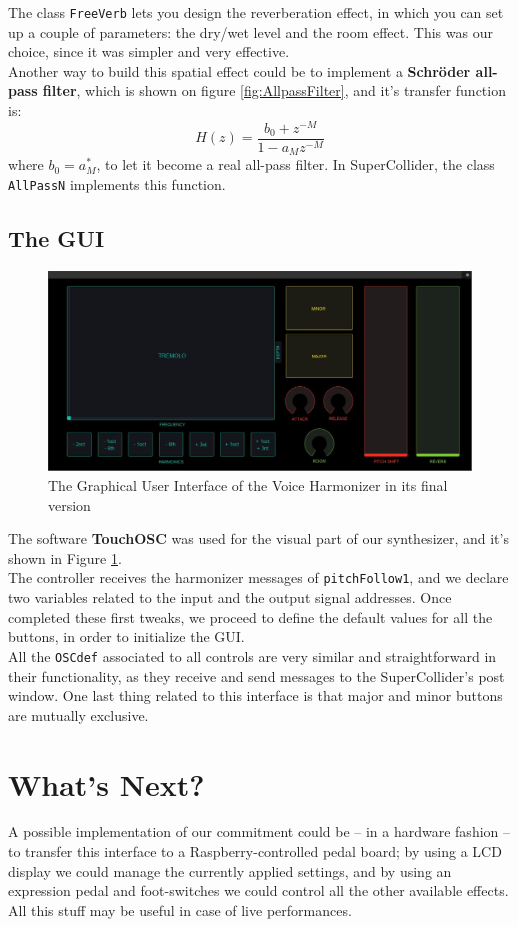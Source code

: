 \documentclass[11pt]{article}
\begin{document}
The class \texttt{FreeVerb} lets you design the reverberation effect, in which you can set up a couple of parameters: the dry/wet level and the room effect. This was our choice, since it was simpler and very effective.\\
Another way to build this spatial effect could be to implement a \textbf{Schröder all-pass filter}, which is shown on figure \ref{fig:AllpassFilter}, and it's transfer function is:
\begin{equation}
\displaystyle
H(z)=\frac{b_0+z^{-M}}{1-a_M z^{-M}}
\end{equation}
where $b_0 = a^*_M$, to let it become a real all-pass filter. In SuperCollider, the class \texttt{AllPassN} implements this function.

\subsection{The GUI}
\begin{figure}
\centering
\includegraphics[width=1\textwidth]{SynthesizerOSC.jpg}
\caption{The Graphical User Interface of the Voice Harmonizer in its final version}
\label{fig:TouchOSC}
\end{figure}

The software \textbf{TouchOSC} was used for the visual part of our synthesizer, and it's shown in Figure \ref{fig:TouchOSC}.\\

The controller receives the harmonizer messages of \texttt{pitchFollow1}, and we declare two variables related to the input and the output signal addresses. Once completed these first tweaks, we proceed to define the default values for all the buttons, in order to initialize the GUI.\\
All the \texttt{OSCdef} associated to all controls are very similar and straightforward in their functionality, as they receive and send messages to the SuperCollider's post window. One last thing related to this interface is that major and minor buttons are mutually exclusive.

\section{What's Next?}
A possible implementation of our commitment could be -- in a hardware fashion -- to transfer this interface to a Raspberry-controlled pedal board; by using a LCD display we could manage the currently applied settings, and by using an expression pedal and foot-switches we could control all the other available effects. All this stuff may be useful in case of live performances.
\end{document}
